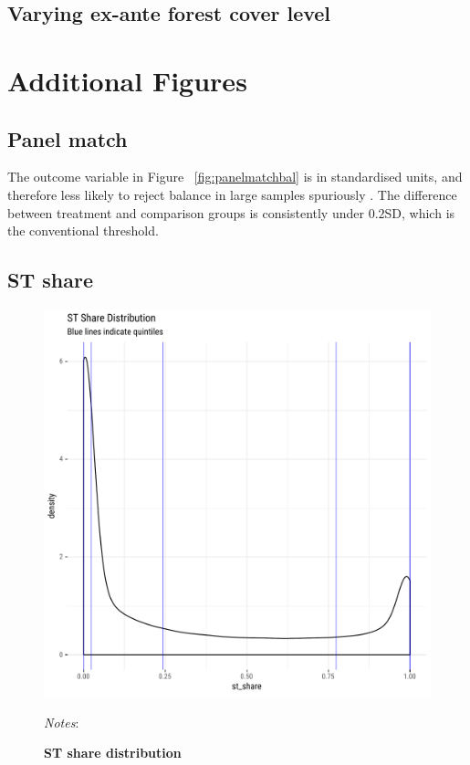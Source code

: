 \documentclass[12pt,reqno]{article}
\begin{document}
\subsection{Varying ex-ante forest cover level}



\section{Additional Figures} %
\subsection{Panel match}
The outcome variable in Figure ~\ref{fig:panelmatchbal} is in standardised units, and therefore less likely to reject balance in
large samples spuriously \parencite{imbens2015causal}. The difference between treatment and
comparison groups is consistently under $0.2$SD, which is the conventional threshold.

\pagebreak



\subsection{ST share}
\begin{figure}[htbp!]
\begin{center}
\begin{minipage}{1 \linewidth}
  \caption{\textbf{ST share distribution}}
  \label{fig:st_share_dist}	
\centerline{\includegraphics[width=4 in,angle=0]{Output/st_share_density.pdf}}
\smallskip
\scriptsize
\emph{Notes}: 
\end{minipage}
\end{center}
\end{figure}
\end{document}
